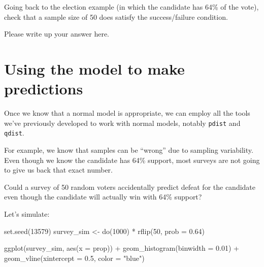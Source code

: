 \documentclass[
]{book}
\newenvironment{Shaded}{\begin{snugshade}}{\end{snugshade}}
\newcommand{\AttributeTok}[1]{\textcolor[rgb]{0.77,0.63,0.00}{#1}}
\newcommand{\DecValTok}[1]{\textcolor[rgb]{0.00,0.00,0.81}{#1}}
\newcommand{\FloatTok}[1]{\textcolor[rgb]{0.00,0.00,0.81}{#1}}
\newcommand{\FunctionTok}[1]{\textcolor[rgb]{0.00,0.00,0.00}{#1}}
\newcommand{\NormalTok}[1]{#1}
\newcommand{\OtherTok}[1]{\textcolor[rgb]{0.56,0.35,0.01}{#1}}
\newcommand{\SpecialCharTok}[1]{\textcolor[rgb]{0.00,0.00,0.00}{#1}}
\newcommand{\StringTok}[1]{\textcolor[rgb]{0.31,0.60,0.02}{#1}}
\begin{document}
Going back to the election example (in which the candidate has 64\% of the vote), check that a sample size of 50 does satisfy the success/failure condition.

Please write up your answer here.

\hypertarget{samp-dist-models-predictions}{%
\section{Using the model to make predictions}\label{samp-dist-models-predictions}}

Once we know that a normal model is appropriate, we can employ all the tools we've previously developed to work with normal models, notably \texttt{pdist} and \texttt{qdist}.

For example, we know that samples can be ``wrong'' due to sampling variability. Even though we know the candidate has 64\% support, most surveys are not going to give us back that exact number.

Could a survey of 50 random voters accidentally predict defeat for the candidate even though the candidate will actually win with 64\% support?

Let's simulate:

\begin{Shaded}
\begin{Highlighting}[]
\FunctionTok{set.seed}\NormalTok{(}\DecValTok{13579}\NormalTok{)}
\NormalTok{survey\_sim }\OtherTok{\textless{}{-}} \FunctionTok{do}\NormalTok{(}\DecValTok{1000}\NormalTok{) }\SpecialCharTok{*} \FunctionTok{rflip}\NormalTok{(}\DecValTok{50}\NormalTok{, }\AttributeTok{prob =} \FloatTok{0.64}\NormalTok{)}
\end{Highlighting}
\end{Shaded}

\begin{Shaded}
\begin{Highlighting}[]
\FunctionTok{ggplot}\NormalTok{(survey\_sim, }\FunctionTok{aes}\NormalTok{(}\AttributeTok{x =}\NormalTok{ prop)) }\SpecialCharTok{+}
    \FunctionTok{geom\_histogram}\NormalTok{(}\AttributeTok{binwidth =} \FloatTok{0.01}\NormalTok{) }\SpecialCharTok{+}
    \FunctionTok{geom\_vline}\NormalTok{(}\AttributeTok{xintercept =} \FloatTok{0.5}\NormalTok{, }\AttributeTok{color =} \StringTok{"blue"}\NormalTok{)}
\end{Highlighting}
\end{Shaded}
\end{document}

